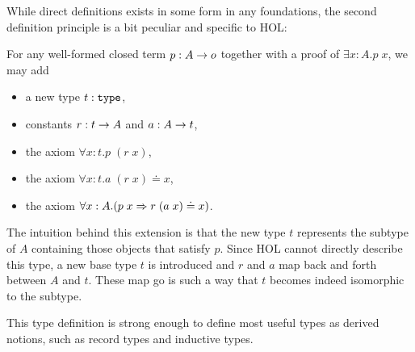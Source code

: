 While direct definitions exists in some form in any foundations, the second definition principle is a bit peculiar and specific to HOL:

\begin{definition}
For any well-formed closed term $p:A\rightarrow o$ together with a proof of $\exists x:A.p\;x$, we may add
\begin{itemize}
 \item a new type $t:\mathtt{type}$,
 \item constants $r:t\rightarrow A$ and $a:A\rightarrow t$,
 \item the axiom $\forall x:t.p\;(r\;x)$,
 \item the axiom $\forall x:t.a\;(r\;x)\doteq x$,
 \item the axiom $\forall x:A.(p\;x \Rightarrow r\;(a\;x)\doteq x)$.
\end{itemize}
\end{definition}

The intuition behind this extension is that the new type $t$ represents the subtype of $A$ containing those objects that satisfy $p$. Since HOL cannot directly describe this type, a new base type $t$ is introduced and $r$ and $a$ map back and forth between $A$ and $t$. These map go is such a way that $t$ becomes indeed isomorphic to the subtype.

This type definition is strong enough to define most useful types as derived notions, such as record types and inductive types.